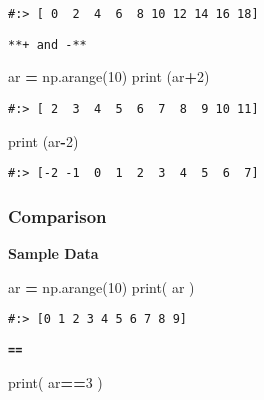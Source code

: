 \documentclass[
]{book}
\newenvironment{Shaded}{\begin{snugshade}}{\end{snugshade}}
\newcommand{\BuiltInTok}[1]{#1}
\newcommand{\DecValTok}[1]{\textcolor[rgb]{0.06,0.06,0.06}{#1}}
\newcommand{\NormalTok}[1]{#1}
\newcommand{\OperatorTok}[1]{\textcolor[rgb]{0.43,0.43,0.43}{\textbf{#1}}}
\begin{document}
\begin{verbatim}
#:> [ 0  2  4  6  8 10 12 14 16 18]
\end{verbatim}

\texttt{**+\ and\ -**}

\begin{Shaded}
\begin{Highlighting}[]
\NormalTok{ar }\OperatorTok{=}\NormalTok{ np.arange(}\DecValTok{10}\NormalTok{)}
\BuiltInTok{print}\NormalTok{ (ar}\OperatorTok{+}\DecValTok{2}\NormalTok{)}
\end{Highlighting}
\end{Shaded}

\begin{verbatim}
#:> [ 2  3  4  5  6  7  8  9 10 11]
\end{verbatim}

\begin{Shaded}
\begin{Highlighting}[]
\BuiltInTok{print}\NormalTok{ (ar}\OperatorTok{{-}}\DecValTok{2}\NormalTok{)}
\end{Highlighting}
\end{Shaded}

\begin{verbatim}
#:> [-2 -1  0  1  2  3  4  5  6  7]
\end{verbatim}

\hypertarget{comparison}{%
\subsubsection{Comparison}\label{comparison}}

\textbf{Sample Data}

\begin{Shaded}
\begin{Highlighting}[]
\NormalTok{ar }\OperatorTok{=}\NormalTok{ np.arange(}\DecValTok{10}\NormalTok{)}
\BuiltInTok{print}\NormalTok{( ar )}
\end{Highlighting}
\end{Shaded}

\begin{verbatim}
#:> [0 1 2 3 4 5 6 7 8 9]
\end{verbatim}

\textbf{\texttt{==}}

\begin{Shaded}
\begin{Highlighting}[]
\BuiltInTok{print}\NormalTok{( ar}\OperatorTok{==}\DecValTok{3}\NormalTok{ )}
\end{Highlighting}
\end{Shaded}
\end{document}
